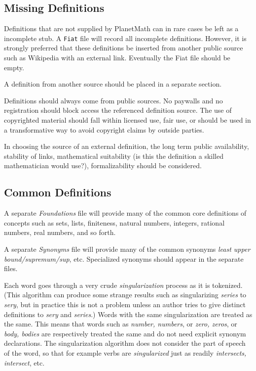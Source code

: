 \documentclass[12pt]{article}
\numberwithin{definition}{section}
\begin{document}
%
\subsection{Missing Definitions} Definitions that are not supplied by PlanetMath can 
in rare cases be left as a
  incomplete stub.  A {\tt Fiat} file will record all incomplete definitions.  
  However, it is strongly preferred that these definitions
be inserted from another public source  such as Wikipedia with an external link.
Eventually the Fiat file should be empty.

A definition from another source should be placed in a separate
  section.

Definitions should always come from public sources. No paywalls and no registration should
block access the referenced definition source.  The use of copyrighted material should fall within 
licensed use, fair use, or
should be used in a transformative way to avoid copyright claims by outside parties.  

In choosing the source of an external definition, the long term public availability,
stability of links,
mathematical suitability (is this the definition a skilled mathematician would use?),
formalizability should be considered.


  
\subsection{Common Definitions}
 
A separate \emph{Foundations} file will provide many of the
  common core definitions of concepts such as sets, lists, finiteness,
  natural numbers, integers, rational numbers, real numbers, and so forth.

A separate \emph{Synonyms} file will provide many of the common
synonyms \emph{least upper bound/supremum/sup}, etc.   Specialized
synonyms should appear in the separate files.

Each word goes through a very crude \emph{singularization} process 
as it is tokenized.  (This algorithm can produce some strange results such as
singularizing \emph{series} to \emph{sery}, but in practice this is not a problem unless
an author tries to give distinct definitions to \emph{sery} and \emph{series}.)  
Words with the same singularization are treated as the same.  This means that
words such as \emph{number, numbers}, or \emph{zero, zeros}, or \emph{body, bodies} are
respectively treated the same and do not need explicit synonym declarations.   The singularization
algorithm does not consider the part of speech of the word, so that for example 
verbs are \emph{singularized}
just as readily \emph{intersects, intersect}, etc.
  
\end{document}
